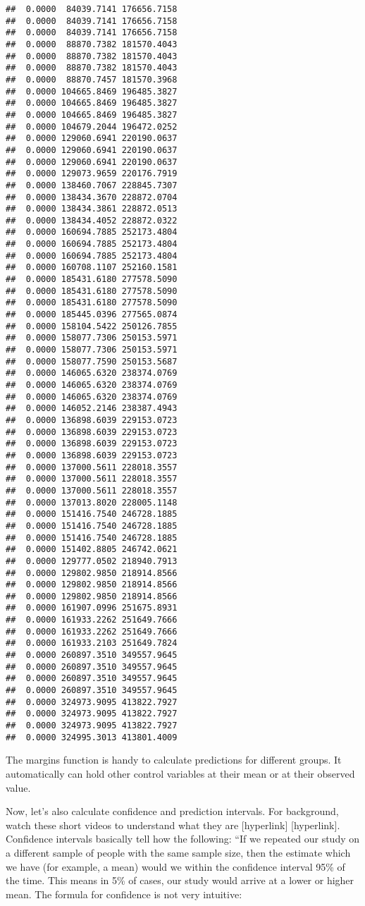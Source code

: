 \documentclass[
]{book}
\begin{document}
\begin{verbatim}
##  0.0000  84039.7141 176656.7158
##  0.0000  84039.7141 176656.7158
##  0.0000  84039.7141 176656.7158
##  0.0000  88870.7382 181570.4043
##  0.0000  88870.7382 181570.4043
##  0.0000  88870.7382 181570.4043
##  0.0000  88870.7457 181570.3968
##  0.0000 104665.8469 196485.3827
##  0.0000 104665.8469 196485.3827
##  0.0000 104665.8469 196485.3827
##  0.0000 104679.2044 196472.0252
##  0.0000 129060.6941 220190.0637
##  0.0000 129060.6941 220190.0637
##  0.0000 129060.6941 220190.0637
##  0.0000 129073.9659 220176.7919
##  0.0000 138460.7067 228845.7307
##  0.0000 138434.3670 228872.0704
##  0.0000 138434.3861 228872.0513
##  0.0000 138434.4052 228872.0322
##  0.0000 160694.7885 252173.4804
##  0.0000 160694.7885 252173.4804
##  0.0000 160694.7885 252173.4804
##  0.0000 160708.1107 252160.1581
##  0.0000 185431.6180 277578.5090
##  0.0000 185431.6180 277578.5090
##  0.0000 185431.6180 277578.5090
##  0.0000 185445.0396 277565.0874
##  0.0000 158104.5422 250126.7855
##  0.0000 158077.7306 250153.5971
##  0.0000 158077.7306 250153.5971
##  0.0000 158077.7590 250153.5687
##  0.0000 146065.6320 238374.0769
##  0.0000 146065.6320 238374.0769
##  0.0000 146065.6320 238374.0769
##  0.0000 146052.2146 238387.4943
##  0.0000 136898.6039 229153.0723
##  0.0000 136898.6039 229153.0723
##  0.0000 136898.6039 229153.0723
##  0.0000 136898.6039 229153.0723
##  0.0000 137000.5611 228018.3557
##  0.0000 137000.5611 228018.3557
##  0.0000 137000.5611 228018.3557
##  0.0000 137013.8020 228005.1148
##  0.0000 151416.7540 246728.1885
##  0.0000 151416.7540 246728.1885
##  0.0000 151416.7540 246728.1885
##  0.0000 151402.8805 246742.0621
##  0.0000 129777.0502 218940.7913
##  0.0000 129802.9850 218914.8566
##  0.0000 129802.9850 218914.8566
##  0.0000 129802.9850 218914.8566
##  0.0000 161907.0996 251675.8931
##  0.0000 161933.2262 251649.7666
##  0.0000 161933.2262 251649.7666
##  0.0000 161933.2103 251649.7824
##  0.0000 260897.3510 349557.9645
##  0.0000 260897.3510 349557.9645
##  0.0000 260897.3510 349557.9645
##  0.0000 260897.3510 349557.9645
##  0.0000 324973.9095 413822.7927
##  0.0000 324973.9095 413822.7927
##  0.0000 324973.9095 413822.7927
##  0.0000 324995.3013 413801.4009
\end{verbatim}

The margins function is handy to calculate predictions for different groups.
It automatically can hold other control variables at their mean or at their observed value.

Now, let's also calculate confidence and prediction intervals. For background, watch these short videos to understand what they are {[}hyperlink{]} {[}hyperlink{]}. Confidence intervals basically tell how the following: ``If we repeated our study on a different sample of people with the same sample size, then the estimate which we have (for example, a mean) would we within the confidence interval 95\% of the time. This means in 5\% of cases, our study would arrive at a lower or higher mean. The formula for confidence is not very intuitive:
\end{document}
